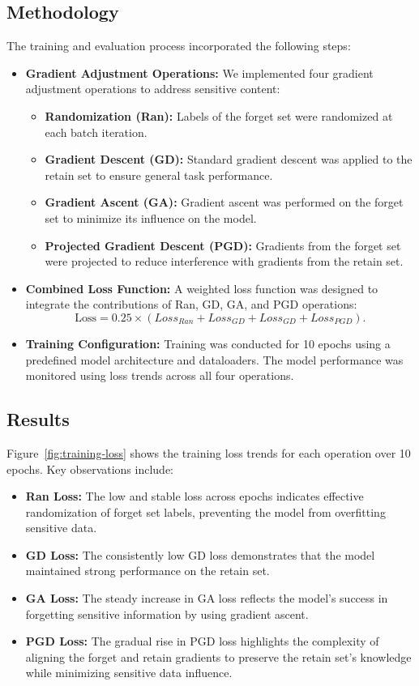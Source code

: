 \documentclass[11pt]{article}
\begin{document}
    \subsection{Methodology}
    The training and evaluation process incorporated the following steps:
    \begin{itemize}
        \item \textbf{Gradient Adjustment Operations:} We implemented four gradient adjustment operations to address sensitive content:
        \begin{itemize}
            \item \textbf{Randomization (Ran):} Labels of the forget set were randomized at each batch iteration.
            \item \textbf{Gradient Descent (GD):} Standard gradient descent was applied to the retain set to ensure general task performance.
            \item \textbf{Gradient Ascent (GA):} Gradient ascent was performed on the forget set to minimize its influence on the model.
            \item \textbf{Projected Gradient Descent (PGD):} Gradients from the forget set were projected to reduce interference with gradients from the retain set.
        \end{itemize}
        \item \textbf{Combined Loss Function:} A weighted loss function was designed to integrate the contributions of Ran, GD, GA, and PGD operations:
        \[
            \text{Loss} = 0.25 \times (Loss_{Ran} + Loss_{GD} + Loss_{GD} + Loss_{PGD}).
        \]
        \item \textbf{Training Configuration:} Training was conducted for 10 epochs using a predefined model architecture and dataloaders. The model performance was monitored using loss trends across all four operations.
    \end{itemize}

    \subsection{Results}
    Figure~\ref{fig:training-loss} shows the training loss trends for each operation over 10 epochs. Key observations include:
    \begin{itemize}
        \item \textbf{Ran Loss:} The low and stable loss across epochs indicates effective randomization of forget set labels, preventing the model from overfitting sensitive data.
        \item \textbf{GD Loss:} The consistently low GD loss demonstrates that the model maintained strong performance on the retain set.
        \item \textbf{GA Loss:} The steady increase in GA loss reflects the model's success in forgetting sensitive information by using gradient ascent.
        \item \textbf{PGD Loss:} The gradual rise in PGD loss highlights the complexity of aligning the forget and retain gradients to preserve the retain set's knowledge while minimizing sensitive data influence.
    \end{itemize}
\end{document}
